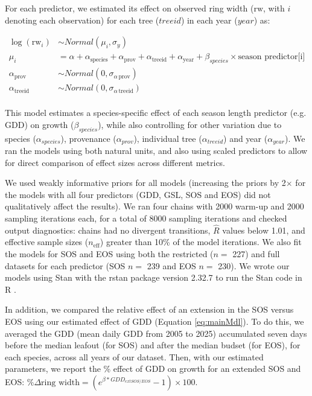 \documentclass{article}\usepackage[]{graphicx}\usepackage[]{xcolor}
\begin{document}
For each predictor, we estimated its effect on observed ring width ($\text{rw}$, with $i$ denoting each observation) for each tree ($treeid$) in each year ($year$) as:

\begin{equation}
\begin{aligned}
\log(\text{rw}_i) &\sim Normal(\mu_i, \sigma_y) \\ 
\mu_i &= \alpha + \alpha_{\text{species}} + \alpha_{\text{prov}} + \alpha_{\text{treeid}} + \alpha_{\text{year}} + \beta_{species} \times \text{season predictor[i]} \\
\alpha_{\text{prov}} &\sim Normal(0, \sigma_{\alpha \, \text{prov}}) \\
\alpha_{\text{treeid}} &\sim Normal(0, \sigma_{\alpha \, \text{treeid}}) \\
\end{aligned}
\label{eq:mainMdl}
\end{equation}

This model estimates a species-specific effect of each season length predictor (e.g. GDD) on growth ($\beta_{species}$), while also controlling for other variation due to species ($\alpha_{species}$), provenance ($\alpha_{prov}$), individual tree ($\alpha_{treeid}$) and year ($\alpha_{year}$). We ran the models using both natural units, and also using scaled predictors \citep[via $z$-scoring.][]{gelman_data_2006} to allow for direct comparison of effect sizes across different metrics.

We used weakly informative priors for all models (increasing the priors by 2$\times$ for the  models with all four predictors (GDD, GSL, SOS and EOS) did not qualitatively affect the results). We ran four chains with 2000 warm-up and 2000 sampling iterations each, for a total of 8000 sampling iterations and checked output diagnostics: chains had no divergent transitions, $\hat{R}$ values below 1.01, and effective sample sizes ($n_{\text{eff}}$) greater than 10\% of the model iterations. We also fit the models for SOS and EOS using both the restricted ($n =$ 227) and full datasets for each predictor (SOS $n =$ 239 and EOS $n =$ 230). We wrote our models using Stan \citep{carpenter_stan_2017} with the rstan package version 2.32.7 \citep{standevelopmentteam_rstan_2025} to run the Stan code in R \citep{rcoreteam_language_2021}.

In addition, we compared the relative effect of an extension in the SOS versus EOS using our estimated effect of GDD (Equation \ref{eq:mainMdl}). To do this, we averaged the GDD (mean daily GDD from 2005 to 2025) accumulated seven days before the median leafout (for SOS) and after the median budset (for EOS), for each species, across all years of our dataset. Then, with our estimated parameters, we report the \% effect of GDD on growth for an extended SOS and EOS: $\% \Delta \text{ring width} = (e^{\beta*GDD_{extSOS/EOS}}-1) \times 100$.
\end{document}
